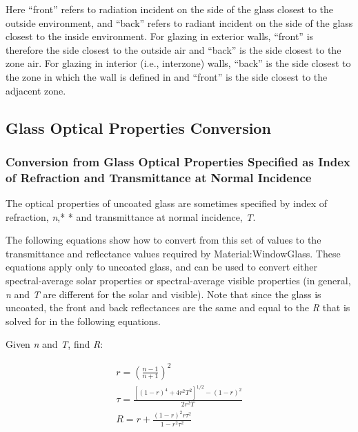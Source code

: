 Here ``front'' refers to radiation incident on the side of the glass closest to the outside environment, and ``back'' refers to radiant incident on the side of the glass closest to the inside environment. For glazing in exterior walls, ``front'' is therefore the side closest to the outside air and ``back'' is the side closest to the zone air. For glazing in interior (i.e., interzone) walls, ``back'' is the side closest to the zone in which the wall is defined in and ``front'' is the side closest to the adjacent zone.

\subsection{Glass Optical Properties Conversion}\label{glass-optical-properties-conversion}

\subsubsection{Conversion from Glass Optical Properties Specified as Index of Refraction and Transmittance at Normal Incidence}\label{conversion-from-glass-optical-properties-specified-as-index-of-refraction-and-transmittance-at-normal-incidence}

The optical properties of uncoated glass are sometimes specified by index of refraction, \emph{n},* * and transmittance at normal incidence, \emph{T}.

The following equations show how to convert from this set of values to the transmittance and reflectance values required by Material:WindowGlass. These equations apply only to uncoated glass, and can be used to convert either spectral-average solar properties or spectral-average visible properties (in general, \emph{n} and \emph{T} are different for the solar and visible). Note that since the glass is uncoated, the front and back reflectances are the same and equal to the \emph{R} that is solved for in the following equations.

Given \emph{n} and \emph{T}, find \emph{R}:

\begin{equation}
  \begin{array}{l}
    r = \left( \frac{n - 1}{n + 1} \right)^2 \\
    \tau  = \frac{\left[ (1 - r)^4 + 4 r^2 T^2 \right]^{1/2} - (1 - r)^2}{2 r^2 T} \\
    R = r + \frac{(1 - r)^2 r \tau ^2}{1 - r^2 \tau ^2}
  \end{array}
\end{equation}

